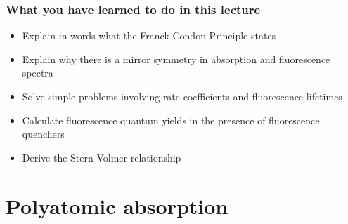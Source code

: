 \documentclass[a4paper,12pt,titlepage]{article}
\begin{document}
\begin{frame}
\frametitle{What you have learned to do in this lecture}
\begin{itemize}
\item Explain in words what the Franck-Condon Principle states
\item Explain why there is a mirror symmetry in absorption and fluorescence spectra
\item Solve simple problems involving rate coefficients and fluorescence lifetimes
\item Calculate fluorescence quantum yields in the presence of fluorescence quenchers
\item Derive the Stern-Volmer relationship
\end{itemize}
\end{frame}

\section{Polyatomic absorption}

	
\end{document}
